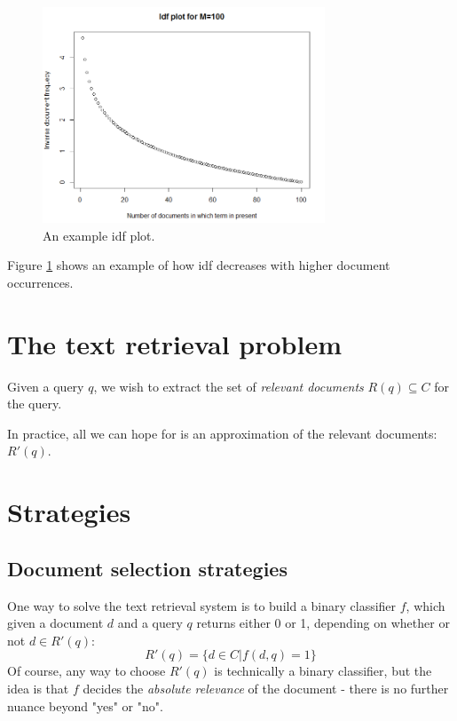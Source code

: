 \documentclass[12pt, a4paper]{article}
\numberwithin{equation}{section}
\begin{document}
\begin{figure}
\centering
\includegraphics[width=0.75\textwidth]{idf_plot}
\caption{An example idf plot.}
\label{fig:idf_plot}
\end{figure}

Figure \ref{fig:idf_plot} shows an example of how idf decreases with higher document occurrences.

\section{The text retrieval problem}
Given a query $q$, we wish to extract the set of \textit{relevant documents} $R(q)\subseteq C$ for the query.

In practice, all we can hope for is an approximation of the relevant documents: $R'(q)$.

\section{Strategies}

\subsection{Document selection strategies}
One way to solve the text retrieval system is to build a binary classifier $f$, which given a document $d$ and a query $q$ returns either 0 or 1, depending on whether or not $d\in R'(q)$:
\begin{equation}
R'(q)=\{d\in C|f(d,q)=1\}
\end{equation}
Of course, any way to choose $R'(q)$ is technically a binary classifier, but the idea is that $f$ decides the \textit{absolute relevance} of the document - there is no further nuance beyond "yes" or "no".
\end{document}
